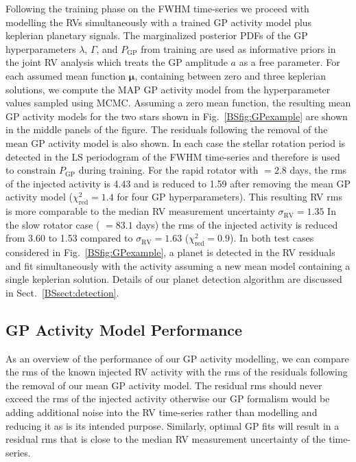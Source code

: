 Following the training phase on the FWHM time-series
we proceed with modelling the RVs simultaneously with a trained GP activity model plus keplerian planetary
signals. The marginalized posterior PDFs of the GP hyperparameters $\lambda$, $\Gamma$, and $P_{\text{GP}}$
from training are used as informative priors in the joint RV analysis which treats the GP amplitude
$a$ as a free parameter. For each assumed mean function $\boldsymbol{\mu}$, containing between zero and three
keplerian solutions, we compute the MAP GP activity model from the hyperparameter values sampled using MCMC.
Assuming a zero mean function, the resulting mean GP activity models
for the two stars shown in Fig.~\ref{BSfig:GPexample} are shown in the middle panels of the figure. The residuals
following the removal of the mean GP activity model is also shown. In each case the stellar rotation period is
detected in the LS periodogram of the FWHM time-series and therefore is used to constrain $P_{\text{GP}}$ during
training. For the rapid rotator with \prot{} $=2.8$ days, the rms of the injected activity is 4.43 \mps{} and
is reduced to 1.59 \mps{} after removing the mean GP activity model ($\chi_{\text{red}}^2 =1.4$ for four GP hyperparameters).
This resulting RV rms is more comparable
to the median RV measurement uncertainty $\sigma_{\text{RV}}=1.35$  In the slow rotator case (\prot{} $=83.1$ days)
the rms of the injected activity is reduced from 3.60 \mps{} to 1.53 \mps{} compared to
$\sigma_{\text{RV}}=1.63$ \mps{} ($\chi_{\text{red}}^2 =0.9$). In both test cases considered in
Fig.~\ref{BSfig:GPexample}, a planet is detected in the RV residuals and fit simultaneously with the activity assuming
a new mean model containing a single keplerian solution. Details of our planet detection algorithm are discussed in
Sect.~\ref{BSsect:detection}.


\subsection{GP Activity Model Performance}
As an overview of the performance of our GP activity modelling, we can compare the rms of the known
injected RV activity with the rms of the residuals following the removal of our mean GP activity model. The residual
rms should never exceed the rms of the injected activity otherwise our GP formalism would be adding additional noise
into the RV time-series rather than modelling and reducing it as is its intended purpose. Similarly, optimal GP fits
will result in a residual rms that is close to the median RV measurement uncertainty of the time-series.

